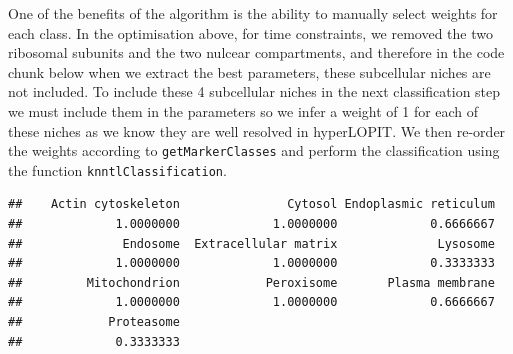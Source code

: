 One of the benefits of the algorithm is the ability to manually select
weights for each class. In the optimisation above, for time constraints,
we removed the two ribosomal subunits and the two nulcear compartments,
and therefore in the code chunk below when we extract the best
parameters, these subcellular niches are not included. To include these
4 subcellular niches in the next classification step we must include
them in the parameters so we infer a weight of 1 for each of these
niches as we know they are well resolved in hyperLOPIT. We then re-order
the weights according to \texttt{getMarkerClasses} and perform the
classification using the function \texttt{knntlClassification}.

\begin{Shaded}
\begin{Highlighting}[]
\StringTok{ }
\end{Highlighting}
\end{Shaded}

\begin{verbatim}
##    Actin cytoskeleton               Cytosol Endoplasmic reticulum 
##             1.0000000             1.0000000             0.6666667 
##              Endosome  Extracellular matrix              Lysosome 
##             1.0000000             1.0000000             0.3333333 
##         Mitochondrion            Peroxisome       Plasma membrane 
##             1.0000000             1.0000000             0.6666667 
##            Proteasome 
##             0.3333333
\end{verbatim}

\begin{Shaded}
\begin{Highlighting}[]
\StringTok{ }\NormalTok{(}\NormalTok{, }\NormalTok{)}
\StringTok{ }\NormalTok{(}\NormalTok{, }\NormalTok{, }
                         \NormalTok{, }
                         \NormalTok{)}
\StringTok{ }
\end{Highlighting}
\end{Shaded}

